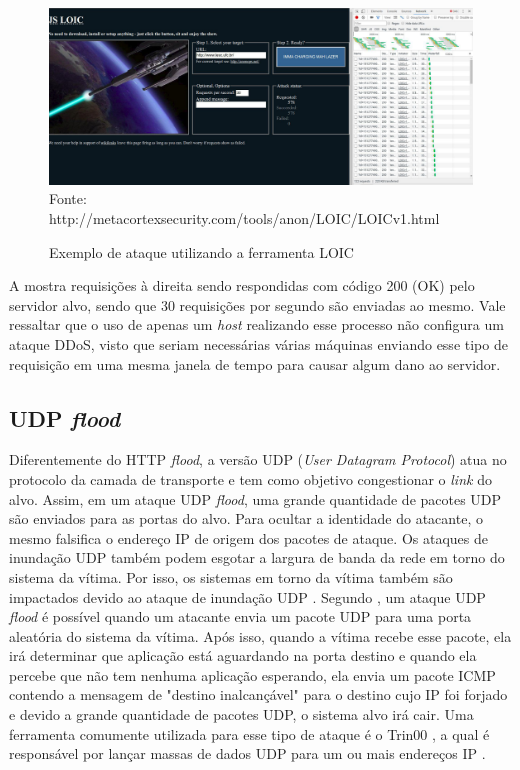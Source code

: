  \begin{figure}[ht]
 	\centering
 	\caption{Exemplo de ataque utilizando a ferramenta LOIC }
 	\includegraphics[width=1\textwidth]{figs/loic.pdf}\\
 	{Fonte: http://metacortexsecurity.com/tools/anon/LOIC/LOICv1.html}
 	\label{fig:loic}
 \end{figure} 
 
 A  mostra requisições à direita sendo respondidas com código 200 (OK) pelo servidor alvo, sendo que 30 requisições por segundo são enviadas ao mesmo. Vale ressaltar que o uso de apenas um \textit{host} realizando  esse processo não configura um ataque DDoS, visto que seriam necessárias várias máquinas enviando esse tipo de requisição em uma mesma janela de tempo para causar algum dano ao servidor.
 
 \subsection{UDP \textit{flood}}
 
 Diferentemente do HTTP \textit{flood}, a versão UDP (\textit{User Datagram Protocol}) atua no protocolo da camada de transporte e tem como objetivo congestionar o \textit{link} do alvo. Assim, em um ataque UDP \textit{flood}, uma grande quantidade de pacotes UDP são enviados para as portas do alvo. Para ocultar a identidade do atacante, o mesmo falsifica o endereço IP de origem dos pacotes de ataque. Os ataques de inundação UDP também podem esgotar a largura de banda da rede em torno do sistema da vítima. Por isso, os sistemas em torno da vítima também são impactados devido ao ataque de inundação UDP \cite{xiaoming2010denial}. Segundo , um ataque UDP \textit{flood} é possível quando um atacante envia um pacote UDP para uma porta aleatória do sistema da vítima. Após isso, quando a vítima recebe esse pacote, ela irá determinar que aplicação está aguardando na porta destino e quando ela percebe que não tem nenhuma aplicação esperando, ela envia um pacote ICMP contendo a mensagem de "destino inalcançável" para o destino cujo IP foi forjado e devido a grande quantidade de pacotes UDP, o sistema alvo irá cair. Uma ferramenta comumente utilizada para esse tipo de ataque é o Trin00 \cite{criscuolo2000distributed}, a qual é responsável por lançar massas de dados UDP para um ou mais endereços IP \cite{dittrich2002projectos}.
 
